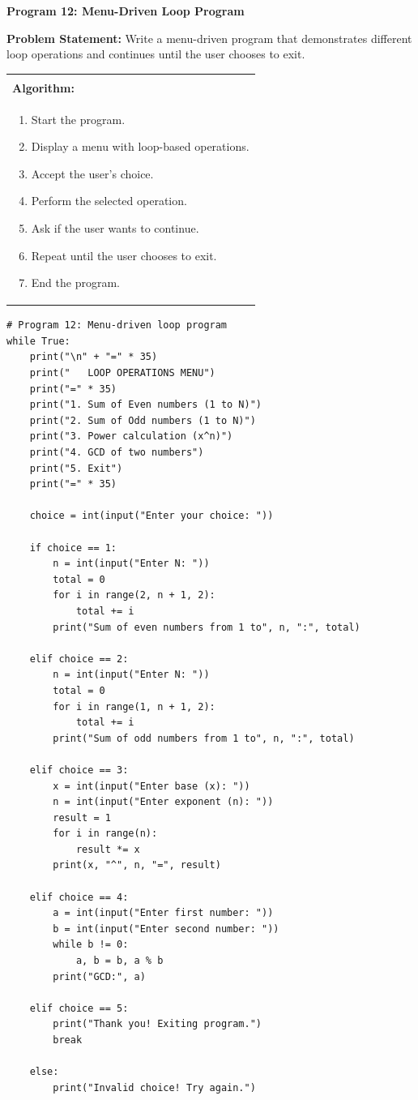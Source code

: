 \documentclass[12pt,a4paper]{article}
\makeatletter
\newenvironment{algobox}{%
  \par\vspace{4pt}%
  \noindent\begin{tabular}{@{}p{\linewidth}@{}}%
  \hline\\[-8pt]%
  \textbf{\color{blue!60!black}\small Algorithm:}\\[2pt]%
}{%
  \\[-4pt]\hline%
  \end{tabular}\par\vspace{4pt}%
}
\makeatother
\begin{document}
\vspace{0.5cm}

\textbf{Program 12: Menu-Driven Loop Program}

\textbf{Problem Statement:}
Write a menu-driven program that demonstrates different loop operations and continues until the user chooses to exit.

\begin{algobox}
\begin{enumerate}[label=Step \arabic*:]
  \item Start the program.
  \item Display a menu with loop-based operations.
  \item Accept the user's choice.
  \item Perform the selected operation.
  \item Ask if the user wants to continue.
  \item Repeat until the user chooses to exit.
  \item End the program.
\end{enumerate}
\end{algobox}

\begin{lstlisting}
# Program 12: Menu-driven loop program
while True:
    print("\n" + "=" * 35)
    print("   LOOP OPERATIONS MENU")
    print("=" * 35)
    print("1. Sum of Even numbers (1 to N)")
    print("2. Sum of Odd numbers (1 to N)")
    print("3. Power calculation (x^n)")
    print("4. GCD of two numbers")
    print("5. Exit")
    print("=" * 35)

    choice = int(input("Enter your choice: "))

    if choice == 1:
        n = int(input("Enter N: "))
        total = 0
        for i in range(2, n + 1, 2):
            total += i
        print("Sum of even numbers from 1 to", n, ":", total)

    elif choice == 2:
        n = int(input("Enter N: "))
        total = 0
        for i in range(1, n + 1, 2):
            total += i
        print("Sum of odd numbers from 1 to", n, ":", total)

    elif choice == 3:
        x = int(input("Enter base (x): "))
        n = int(input("Enter exponent (n): "))
        result = 1
        for i in range(n):
            result *= x
        print(x, "^", n, "=", result)

    elif choice == 4:
        a = int(input("Enter first number: "))
        b = int(input("Enter second number: "))
        while b != 0:
            a, b = b, a % b
        print("GCD:", a)

    elif choice == 5:
        print("Thank you! Exiting program.")
        break

    else:
        print("Invalid choice! Try again.")
\end{lstlisting}
\end{document}
